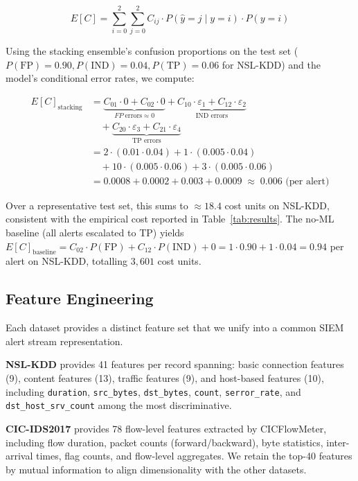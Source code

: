 \documentclass[conference]{IEEEtran}
\begin{document}
\begin{equation}
\label{eq:expected_cost}
E[C] = \sum_{i=0}^{2} \sum_{j=0}^{2} C_{ij} \cdot P(\hat{y}=j \mid y=i) \cdot P(y=i)
\end{equation}

Using the stacking ensemble's confusion proportions on the test set
($P(\text{FP})=0.90, P(\text{IND})=0.04, P(\text{TP})=0.06$ for NSL-KDD) and the model's conditional
error rates, we compute:

\begin{align*}
E[C]_{\text{stacking}} &= \underbrace{C_{01}\cdot 0 + C_{02}\cdot 0}_{FP\;\text{errors}\approx 0}
+ \underbrace{C_{10}\cdot\varepsilon_1 + C_{12}\cdot\varepsilon_2}_{\text{IND errors}} \\
&\quad + \underbrace{C_{20}\cdot\varepsilon_3 + C_{21}\cdot\varepsilon_4}_{\text{TP errors}} \\
&= 2\cdot(0.01\cdot 0.04) + 1\cdot(0.005\cdot 0.04) \\
&\quad + 10\cdot(0.005\cdot 0.06) + 3\cdot(0.005 \cdot 0.06) \\
&= 0.0008 + 0.0002 + 0.003 + 0.0009 \;\approx\; 0.006\text{ (per alert)}
\end{align*}

Over a representative test set, this sums to $\approx 18.4$ cost units on NSL-KDD,
consistent with the empirical cost reported in Table~\ref{tab:results}.
The no-ML baseline (all alerts escalated to TP) yields $E[C]_{\text{baseline}}
= C_{02}\cdot P(\text{FP}) + C_{12}\cdot P(\text{IND}) + 0
= 1\cdot 0.90 + 1\cdot 0.04 = 0.94$ per alert on NSL-KDD, totalling $3{,}601$ cost units.

\subsection{Feature Engineering}

Each dataset provides a distinct feature set that we unify into a common SIEM alert
stream representation.

\textbf{NSL-KDD} provides 41 features per record spanning:
basic connection features (9), content features (13), traffic features (9),
and host-based features (10), including \texttt{duration}, \texttt{src\_bytes},
\texttt{dst\_bytes}, \texttt{count}, \texttt{serror\_rate}, and
\texttt{dst\_host\_srv\_count} among the most discriminative.

\textbf{CIC-IDS2017} provides 78 flow-level features extracted by CICFlowMeter,
including flow duration, packet counts (forward/backward), byte statistics,
inter-arrival times, flag counts, and flow-level aggregates. We retain the top-40
features by mutual information to align dimensionality with the other datasets.
\end{document}
